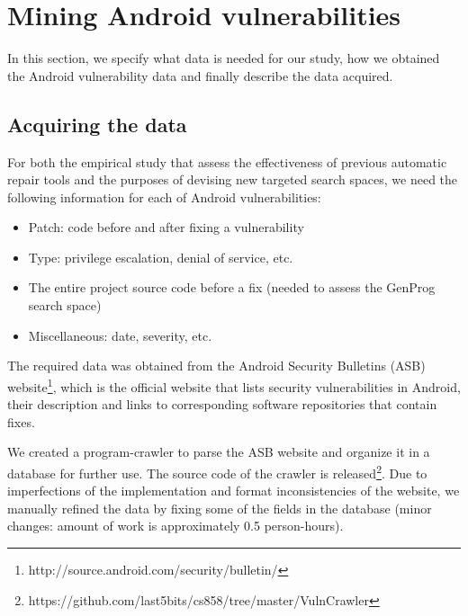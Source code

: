 \section{Mining Android vulnerabilities}
\label{section:mining}

In this section, we specify what data is needed for our study, how we obtained the Android vulnerability data and finally describe the data acquired.

\subsection{Acquiring the data}
\label{section:mining-acquiring}

For both the empirical study that assess the effectiveness of previous automatic repair tools and the purposes of devising new targeted search spaces, we need the following information for each of Android vulnerabilities:
\begin{itemize}
    \item Patch: code before and after fixing a vulnerability
    \item Type: privilege escalation, denial of service, etc.
    \item The entire project source code before a fix (needed to assess the GenProg search space)
    \item Miscellaneous: date, severity, etc.
\end{itemize}


The required data was obtained from the Android Security Bulletins (ASB) website\footnote{http://source.android.com/security/bulletin/}, which is the official website that lists security vulnerabilities in Android, their description and links to corresponding software repositories that contain fixes.

We created a program-crawler to parse the ASB website and organize it in a database for further use. The source code of the crawler is released\footnote{https://github.com/last5bits/cs858/tree/master/VulnCrawler}. Due to imperfections of the implementation and format inconsistencies of the website, we manually refined the data by fixing some of the fields in the database (minor changes: amount of work is approximately 0.5 person-hours).

